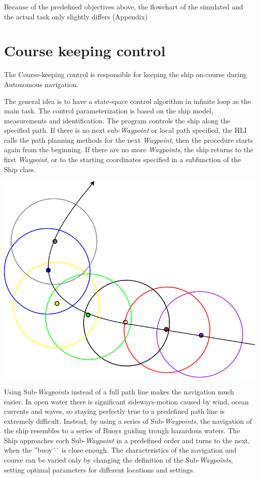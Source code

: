 Because of the predefined objectives above, the flowchart of the simulated and the actual task only slightly differs (Appendix)




\section{Course keeping control}

The Course-keeping control is responsible for keeping the ship on-course during Autonomous navigation.

The general idea is to have a state-space control algorithm in infinite loop as the main task. The control parameterization is based on the ship model, measurements and identification.
The program controls the ship along the specified path. If there is no next sub-\emph{Waypoint} or local path specified, the HLI calls the path planning methods for the next \emph{Waypoint}, then the procedure starts again from the beginning. If there are no more \emph{Waypoints}, the ship returns to the first \emph{Waypoint}, or to the starting coordinates specified in a subfunction of the Ship class.

\includegraphics[width = \textwidth]{img/HLIFigures/SWPNavigationConcept.png}

Using Sub-\emph{Waypoints} instead of a full path line makes the navigation much easier. In open water there is significant sideways-motion caused by wind, ocean currents and waves, so staying perfectly true to a predefined path line is extremely difficult.
Instead, by using a series of Sub-\emph{Waypoints}, the navigation of the ship resembles to a series of Buoys guiding trough hazardous waters. The Ship approaches each Sub-\emph{Waypoint} in a predefined order and turns to the next, when the ''buoy´´ is close enough.
The characteristics of the navigation and course can be varied only by changing the definition of the Sub-\emph{Waypoints}, setting optimal parameters for different locations and settings.

